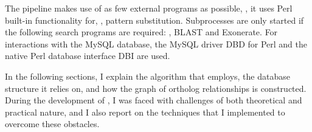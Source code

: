 The pipeline makes use of as few external programs as possible, \ie, it
uses Perl built-in functionality for, \eg, pattern substitution. Subprocesses
are only started if the following search programs are required: ,
BLAST and Exonerate. For interactions with the MySQL database, the MySQL driver
DBD for Perl and the native Perl database
interface DBI are used.

In the following sections, I explain the algorithm that \pname employs, the
database structure it relies on, and how the graph of ortholog relationships is
constructed. During the development of \pname, I was faced with challenges of
both theoretical and practical nature, and I also report on the techniques that
I implemented to overcome these obstacles.

